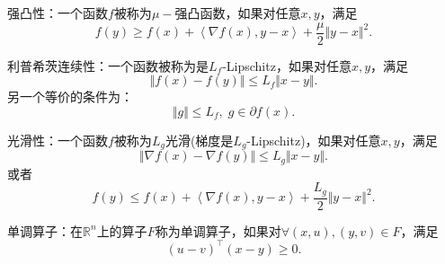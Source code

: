 \begin{definition} \label{def:2.2}
	强凸性：一个函数$f$被称为$\mu-$强凸函数，如果对任意$x,y$，满足
	\begin{equation}
		f(y) \geq f(x)+\left\langle{\nabla f(x), y-x}\right\rangle +\frac{\mu}{2}\Vert y - x \Vert^{2}.
	\end{equation}
\end{definition}	

\begin{definition} \label{def:2.3}
	利普希茨连续性：一个函数被称为是$L_{f}$-Lipschitz，如果对任意$x,y$，满足
	\begin{equation}
		\Vert f(x) - f(y)\Vert \leq L_{f}\Vert x - y\Vert.
	\end{equation}
	另一个等价的条件为：
	\begin{equation}
		\Vert g \Vert \leq L_{f},\;g\in \partial f(x). 
	\end{equation}
\end{definition}
	
\begin{definition} \label{def:2.4}
	光滑性：一个函数$f$被称为$L_{g}$光滑(梯度是$L_{g}$-Lipschitz)，如果对任意$x,y$，满足
	\begin{equation}
			\Vert  \nabla f(x) - \nabla f(y)\Vert \leq L_{g}\Vert x - y\Vert.
	\end{equation}
	或者
	\begin{equation}
		f(y) \leq f(x)+\left\langle{\nabla f(x), y-x}\right\rangle +\frac{L_{g}}{2}\Vert y - x \Vert^{2}.
	\end{equation}
\end{definition}

\begin{definition} \label{def:2.5}
	单调算子：在$\mathbb{R}^n$上的算子$F$称为单调算子，如果对$\forall(x,u),(y,v)\in{F}$，满足
	\begin{equation}
		(u-v)^\top(x-y)\geq{0}.
	\end{equation}
\end{definition}

